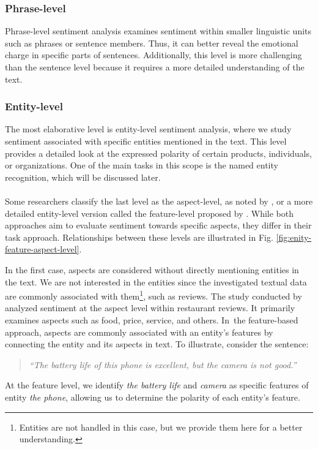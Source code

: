 \subsubsection*{Phrase-level}
\label{subsubsec:phrase-level}
Phrase-level sentiment analysis examines sentiment within smaller linguistic units such as phrases or sentence members. Thus, it can better reveal the emotional charge in specific parts of sentences.  Additionally, this level is more challenging than the sentence level because it requires a more detailed understanding of the text. 


\subsubsection*{Entity-level}
\label{subsubsec:entity-level}
The most elaborative level is entity-level sentiment analysis, where we study sentiment associated with specific entities mentioned in the text. This level provides a detailed look at the expressed polarity of certain products, individuals, or organizations. One of the main tasks in this scope is the named entity recognition, which will be discussed later.

\paragraph{}

Some researchers classify the last level as the aspect-level, as noted by \cite{Wankhade2022}, or a more detailed entity-level version called the feature-level proposed by \cite{Jenifer2017}. While both approaches aim to evaluate sentiment towards specific aspects, they differ in their task approach. Relationships between these levels are illustrated in Fig. \ref{fig:enity-feature-aspect-level}.

In the first case, aspects are considered without directly mentioning entities in the text. We are not interested in the entities since the  investigated textual data are commonly associated with them\footnote{Entities are not handled in this case, but we provide them here for a better understanding.}, such as reviews. The study conducted by \cites{Wang2019} analyzed sentiment at the aspect level within restaurant reviews. It primarily examines aspects such as food, price, service, and others. In~the feature-based approach, aspects are commonly associated with an entity's features by connecting the entity and its aspects in text. To illustrate, consider the sentence:\begin{quote}
    \textit{``The battery life of this phone is excellent, but the camera is not good.''}
\end{quote} At the feature level, we identify \textit{the battery life} and \textit{camera} as specific features of entity \textit{the phone}, allowing us to determine the polarity of each entity's feature.

